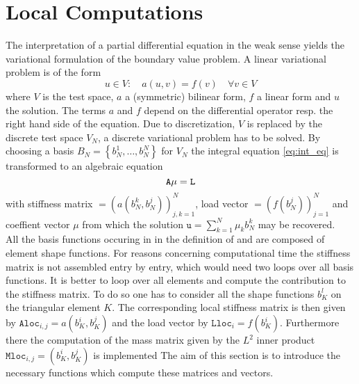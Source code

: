 
\chapter{Local Computations} \label{chap:local_comp}

 The interpretation of a partial differential equation in the weak sense yields the variational formulation of the boundary value problem. A linear variational problem is of the form
\begin{equation} \label{eq:int_eq}
	u \in V: \quad a(u,v) = f(v) \quad \forall v \in V
\end{equation} 
 where $V$ is the test space, $a$ a (symmetric) bilinear form, $f$ a linear form and $u$ the solution. The terms $a$ and $f$ depend on the differential operator resp. the right hand side of the equation. Due to discretization, $V$ is replaced by the discrete test space $V_N$, a discrete variational problem has to be solved. By choosing a basis $B_N = \left\lbrace b^1_N, \ldots, b^N_N \right\rbrace$ for $V_N$ the integral equation \eqref{eq:int_eq} is transformed to an algebraic equation
\begin{equation}
	{\mathtt A} \mu = {\mathtt L} \\
\end{equation}
 with stiffness matrix  $=(a(b^k_N,b^j_N))_{j,k=1}^N$, load vector  $=(f(b^j_N))_{j=1}^N$ and coeffient vector $\mu$ from which the solution ${\mathtt u}=\sum_{k=1}^N \mu_k b^k_N$ may be recovered. \\

 All the basis functions occuring in in the definition of  and  are composed of element shape functions. For reasons concerning computational time the stiffness matrix is not assembled entry by entry, which would need two loops over all basis functions. It is better to loop over all elements and compute the contribution to the stiffness matrix. To do so one has to consider all the shape functions $b_K^l$ on the triangular element $K$. The corresponding local stiffness matrix is then given by $\mathtt{Aloc}_{i,j} = a(b_K^i,b_K^j)$ and the load vector by $\mathtt{Lloc}_{i}=f(b_K^i)$. Furthermore there the computation of the mass matrix given by the $L^2$ inner product $\mathtt{Mloc}_{i,j} = (b_K^i,b_K^j)$ is implemented The aim of this section is to introduce the necessary \MATLAB functions which compute these matrices and vectors.


